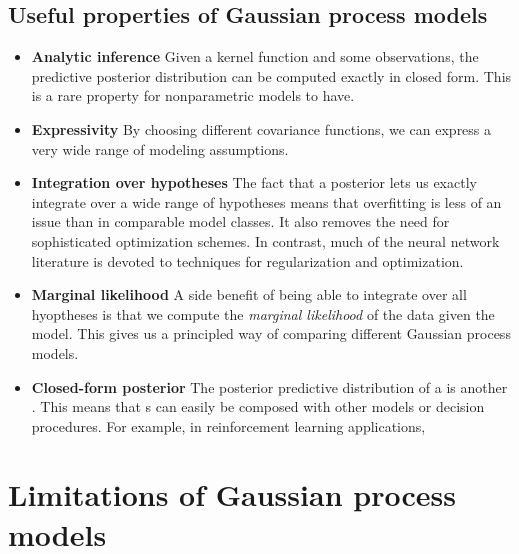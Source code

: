 \subsection{Useful properties of Gaussian process models}

\begin{itemize}

\item {\bf Analytic inference}
Given a kernel function and some observations, the predictive posterior distribution can be computed exactly in closed form.  This is a rare property for nonparametric models to have.

\item {\bf Expressivity}
By choosing different covariance functions, we can express a very wide range of modeling assumptions.

\item {\bf Integration over hypotheses}
The fact that a \gp{} posterior lets us exactly integrate over a wide range of hypotheses means that overfitting is less of an issue than in comparable model classes.
It also removes the need for sophisticated optimization schemes.
%
In contrast, much of the neural network literature is devoted to techniques for regularization and optimization.

\item {\bf Marginal likelihood}
A side benefit of being able to integrate over all hyoptheses is that we compute the \emph{marginal likelihood} of the data given the model.
This gives us a principled way of comparing different Gaussian process models.

\item {\bf Closed-form posterior}
The posterior predictive distribution of a \gp{} is another \gp{}.
This means that \gp{}s can easily be composed with other models or decision procedures.
For example, in reinforcement learning applications, 

\end{itemize}




\section{Limitations of Gaussian process models}

